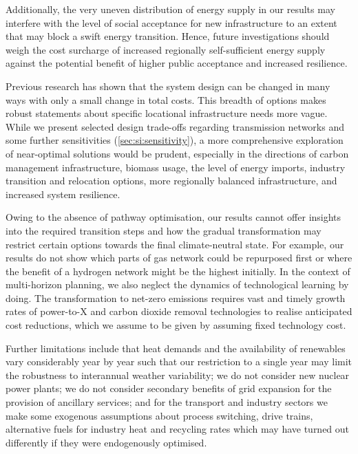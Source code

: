 Additionally, the very uneven distribution of energy supply in our results may
interfere with the level of social acceptance for new infrastructure to an
extent that may block a swift energy transition.
\cite{sasseDistributionalTradeoffs2019,sasseRegionalImpacts2020} Hence, future
investigations should weigh the cost surcharge of increased regionally
self-sufficient energy supply against the potential benefit of higher public
acceptance and increased resilience.

Previous research has shown that the system design can be changed in many ways
with only a small change in total
costs.\cite{Neumann2019,lombardiPolicyDecision2020,pedersenModelingAll2021,pickeringDiversityOptions2022}
This breadth of options makes robust statements about specific locational
infrastructure needs more vague. While we present selected design trade-offs
regarding transmission networks and some further sensitivities
(\cref{sec:si:sensitivity}), a more comprehensive exploration of near-optimal
solutions would be prudent, especially in the directions of carbon management
infrastructure, biomass usage, the level of energy imports, industry transition
and relocation options, more regionally balanced infrastructure, and increased
system resilience.

Owing to the absence of pathway optimisation, our results cannot offer insights
into the required transition steps and how the gradual transformation may
restrict certain options towards the final climate-neutral state. For example,
our results do not show which parts of gas network could be repurposed first or
where the benefit of a hydrogen network might be the highest initially. In the
context of multi-horizon planning, we also neglect the dynamics of technological
learning by
doing.\cite{heubergerPowerCapacity2017,fellingMultihorizonPlanning2022,zeyenEndogenousLearning2022}
The transformation to net-zero emissions requires vast and timely growth rates
of power-to-X and carbon dioxide removal technologies to realise anticipated
cost reductions,\cite{odenwellerProbabilisticFeasibility2022a} which we assume to
be given by assuming fixed technology cost.

Further limitations include that heat demands and the availability of renewables
vary considerably year by year such that our restriction to a single year may
limit the robustness to interannual weather variability; we do not consider new
nuclear power plants; we do not consider secondary benefits of grid expansion
for the provision of ancillary services; and for the transport and industry
sectors we make some exogenous assumptions about process switching, drive
trains, alternative fuels for industry heat and recycling rates which may have
turned out differently if they were endogenously optimised.

